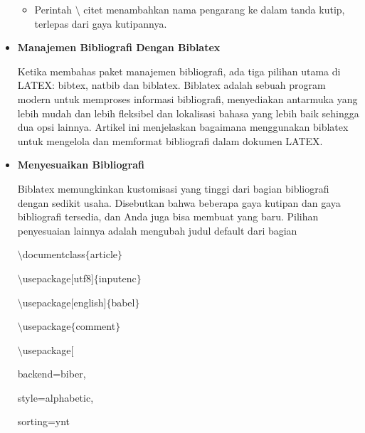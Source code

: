 \begin{itemize}
\begin{itemize}
	\item Perintah $\setminus$ citet menambahkan nama pengarang ke dalam tanda kutip, terlepas dari gaya kutipannya.
\end{itemize}\par
\vspace{\baselineskip}
	\item {\fontsize{14pt}{14pt}\selectfont \textbf{Manajemen Bibliografi Dengan Biblatex}}\par
\vspace{\baselineskip}
Ketika membahas paket manajemen bibliografi, ada tiga pilihan utama di LATEX: bibtex, natbib dan biblatex. Biblatex adalah sebuah program modern untuk memproses informasi bibliografi, menyediakan antarmuka yang lebih mudah dan lebih fleksibel dan lokalisasi bahasa yang lebih baik sehingga dua opsi lainnya. Artikel ini menjelaskan bagaimana menggunakan biblatex untuk mengelola dan memformat bibliografi dalam dokumen LATEX.\par

\vspace{12pt}
	\item {\fontsize{14pt}{14pt}\selectfont \textbf{Menyesuaikan Bibliografi}}\par
\vspace{\baselineskip}
Biblatex memungkinkan kustomisasi yang tinggi dari bagian bibliografi dengan sedikit usaha. Disebutkan bahwa beberapa gaya kutipan dan gaya bibliografi tersedia, dan Anda juga bisa membuat yang baru. Pilihan penyesuaian lainnya adalah mengubah judul default dari bagian ~ \par
\vspace{\baselineskip}
 $\setminus$documentclass$ \{ $article$ \} $\par

$\setminus$usepackage[utf8]$ \{ $inputenc$ \} $\par

$\setminus$usepackage[english]$ \{ $babel$ \} $\par

$\setminus$usepackage$ \{ $comment$ \} $\par

$\setminus$usepackage[\par

backend=biber,\par

style=alphabetic,\par

sorting=ynt\par


\end{itemize}
